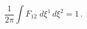 \begin{equation}
\frac{1}{2 \pi} \int F_{12} \; d \xi^1 \, d \xi^2 = 1\,.
\label{eq:0-charge}
\end{equation}

